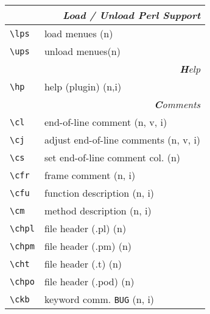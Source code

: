 \documentclass[oneside,10pt,landscape,DIV17]{scrartcl}
\begin{document}
\begin{multicols}{3}
\begin{center}
\begin{tabular}[]{|p{11mm}|p{58mm}|}
\hline
\multicolumn{2}{|r|}{\textsl{\textbf{L}oad / \textbf{U}nload Perl Support}}\\[1.0ex]
\hline \verb'\lps'  & load menues  \hfill (n) \\
\hline \verb'\ups'  & unload menues\hfill (n) \\
\hline
\hline 
\multicolumn{2}{|r|}{\textsl{\textbf{H}elp}}    \\[1.0ex]
\hline \verb'\hp'   & help (plugin) \hfill (n,i)\\
\hline 
\hline
\multicolumn{2}{|r|}{\textsl{\textbf{C}omments}}                       \\[1.0ex]
\hline \verb'\cl'   & end-of-line comment               \hfill (n, v, i)\\
\hline \verb'\cj'   & adjust end-of-line comments       \hfill (n, v, i)\\
\hline \verb'\cs'   & set end-of-line comment col.      \hfill (n)      \\
\hline \verb'\cfr'  & frame comment                     \hfill (n, i)   \\
\hline \verb'\cfu'  & function description              \hfill (n, i)   \\
\hline \verb'\cm'   & method description                \hfill (n, i)   \\
\hline \verb'\chpl' & file header (.pl)                 \hfill (n)      \\
\hline \verb'\chpm' & file header (.pm)                 \hfill (n)      \\
\hline \verb'\cht'  & file header (.t)                  \hfill (n)      \\
\hline \verb'\chpo' & file header (.pod)                \hfill (n)      \\
\hline \verb'\ckb'  & keyword comm. \verb'BUG'          \hfill (n, i)   \\

\end{tabular}
\end{center}
\end{multicols}
\end{document}
